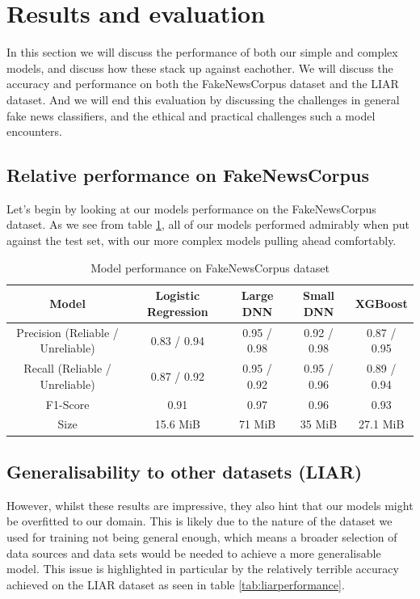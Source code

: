 \section{Results and evaluation}
In this section we will discuss the performance of both our simple and complex models, and discuss how these stack up
against eachother. We will discuss the accuracy and performance on both the FakeNewsCorpus dataset and the LIAR
dataset. And we will end this evaluation by discussing the challenges in general fake news classifiers, and the
ethical and practical challenges such a model encounters.

\subsection{Relative performance on FakeNewsCorpus}
Let's begin by looking at our models performance on the FakeNewsCorpus dataset. As we see from table \ref{tab:fakenewsperformance},
all of our models performed admirably when put against the test set, with our more complex models pulling ahead
comfortably.

\begin{table}[htpb]
  \centering
  \caption{Model performance on FakeNewsCorpus dataset}
  \label{tab:fakenewsperformance}

  \begin{tabular}{c|cccc}
    Model & Logistic Regression & Large DNN & Small DNN & XGBoost \\ \hline
    Precision (Reliable / Unreliable) & 0.83 / 0.94 & 0.95 / 0.98 & 0.92 / 0.98 & 0.87 / 0.95 \\ \hline
    Recall (Reliable / Unreliable) & 0.87 / 0.92 & 0.95 / 0.92 & 0.95 / 0.96 & 0.89 / 0.94 \\ \hline
    F1-Score & 0.91 & 0.97 & 0.96 & 0.93 \\ \hline
    Size & 15.6 MiB & 71 MiB & 35 MiB & 27.1 MiB 
  \end{tabular}
\end{table}

\subsection{Generalisability to other datasets (LIAR)}
However, whilst these results are impressive, they also hint that our models might be overfitted to our domain. This is
likely due to the nature of the dataset we used for training not being general enough, which means a broader selection
of data sources and data sets would be needed to achieve a more generalisable model. This issue is highlighted in
particular by the relatively terrible accuracy achieved on the LIAR dataset as seen in table \ref{tab:liarperformance}.

